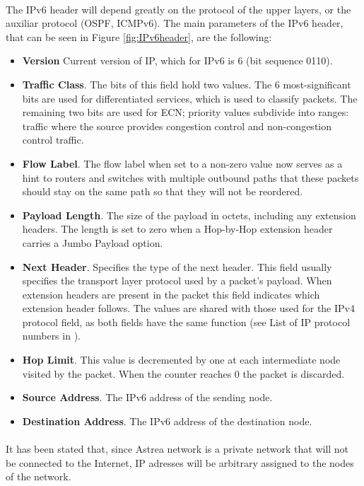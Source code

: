 \paragraph{}The IPv6 header will depend greatly on the protocol of the upper layers, or the auxiliar protocol (OSPF, ICMPv6). The main parameters of the IPv6 header, that can be seen in Figure \ref{fig:IPv6header}, are the following:
\begin{itemize}
\item \textbf{Version} Current version of IP, which for IPv6 is 6 (bit sequence 0110).
\item \textbf{Traffic Class}. The bits of this field hold two values. The 6 most-significant bits are used for differentiated services, which is used to classify packets. The remaining two bits are used for ECN; priority values subdivide into ranges: traffic where the source provides congestion control and non-congestion control traffic.
\item \textbf{Flow Label}. The flow label when set to a non-zero value now serves as a hint to routers and switches with multiple outbound paths that these packets should stay on the same path so that they will not be reordered.
\item \textbf{Payload Length}. The size of the payload in octets, including any extension headers. The length is set to zero when a Hop-by-Hop extension header carries a Jumbo Payload option.
\item \textbf{Next Header}. Specifies the type of the next header. This field usually specifies the transport layer protocol used by a packet's payload. When extension headers are present in the packet this field indicates which extension header follows. The values are shared with those used for the IPv4 protocol field, as both fields have the same function (see List of IP protocol numbers in \cite{IANAPN}).
\item \textbf{Hop Limit}. This value is decremented by one at each intermediate node visited by the packet. When the counter reaches 0 the packet is discarded.
\item \textbf{Source Address}. The IPv6 address of the sending node.
\item \textbf{Destination Address}. The IPv6 address of the destination node.
\end{itemize}
\paragraph{}It has been stated that, since Astrea network is a private network that will not be connected to the Internet, IP adresses will be arbitrary assigned to the nodes of the network.
